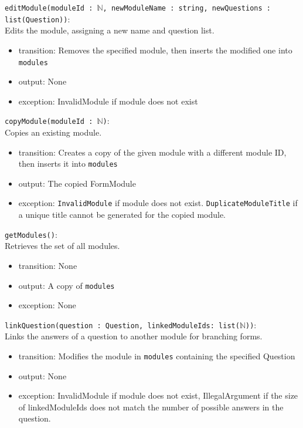 \documentclass[12pt, titlepage]{article}
\begin{document}
\noindent \texttt{editModule(moduleId : $\mathbb{N}$, newModuleName : string, newQuestions : list(Question))}: \\
Edits the module, assigning a new name and question list.
\begin{itemize}
\item transition: Removes the specified module, then inserts the modified one into \texttt{modules}
\item output: None
\item exception: InvalidModule if module does not exist
\end{itemize}

\noindent \texttt{copyModule(moduleId : $\mathbb{N}$)}: \\
Copies an existing module.
\begin{itemize}
\item transition: Creates a copy of the given module with a different module ID, then inserts it into \texttt{modules}
\item output: The copied FormModule
\item exception: \texttt{InvalidModule} if module does not exist. \texttt{DuplicateModuleTitle} if a unique title cannot be generated for the copied module.
\end{itemize}

\noindent \texttt{getModules()}: \\
Retrieves the set of all modules.
\begin{itemize}
\item transition: None
\item output: A copy of \texttt{modules}
\item exception: None
\end{itemize}

\noindent \texttt{linkQuestion(question : Question, linkedModuleIds: list($\mathbb{N}$))}: \\
Links the answers of a question to another module for branching forms.
\begin{itemize}
\item transition: Modifies the module in \texttt{modules} containing the specified Question
\item output: None
\item exception: InvalidModule if module does not exist, IllegalArgument if the size of linkedModuleIds does not match the number of possible answers in the question.
\end{itemize}
\end{document}
